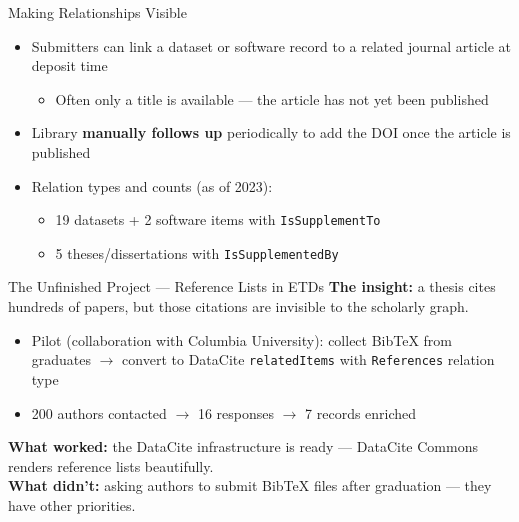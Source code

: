 \documentclass[aspectratio=169]{beamer}
\begin{document}
\begin{frame}{Making Relationships Visible}
\begin{itemize}
    \item Submitters can link a dataset or software record to a
          related journal article at deposit time
    \begin{itemize}
        \item Often only a title is available — the article has not
              yet been published
    \end{itemize}
    \item Library \textbf{manually follows up} periodically to add
          the DOI once the article is published
    \item Relation types and counts (as of 2023):
    \begin{itemize}
        \item 19 datasets + 2 software items with \texttt{IsSupplementTo}
        \item 5 theses/dissertations with \texttt{IsSupplementedBy}
    \end{itemize}
\end{itemize}
\end{frame}

\begin{frame}{The Unfinished Project — Reference Lists in ETDs}
\textbf{The insight:} a thesis cites hundreds of papers, but those
citations are invisible to the scholarly graph.
\vspace{0.5em}
\begin{itemize}
    \item Pilot (collaboration with Columbia University): collect
          BibTeX from graduates $\rightarrow$ convert to DataCite
          \texttt{relatedItems} with \texttt{References} relation type
    \item 200 authors contacted $\rightarrow$ 16 responses $\rightarrow$
          7 records enriched
\end{itemize}
\vspace{0.5em}
\textbf{What worked:} the DataCite infrastructure is ready — DataCite
Commons renders reference lists beautifully.\\[0.3em]
\textbf{What didn't:} asking authors to submit BibTeX files after
graduation — they have other priorities.
\end{frame}
\end{document}

